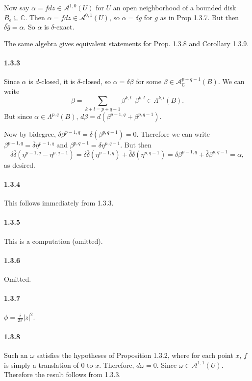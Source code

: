 \documentclass[10pt,letter]{article}
\begin{document}
Now say $\alpha = f dz \in \mathcal{A}^{1,0}(U)$ for $U$ an open neighborhood of a bounded disk $B_{\epsilon} \subseteq \mathbb{C}$. Then $\bar{\alpha} = \bar{f} d\bar{z} \in \mathcal{A}^{0,1}(U)$, so $\bar{\alpha} = \bar{\delta} g$ for $g$ as in Prop 1.3.7. But then $\overline{\delta \bar{g}} = \alpha$. So $\alpha$ is $\delta$-exact. 

The same algebra gives equivalent statements for Prop. 1.3.8 and Corollary 1.3.9. 

\paragraph*{1.3.3} Since $\alpha$ is $d$-closed, it is ${\delta}$-closed, so $\alpha = \delta \beta$ for some $\beta \in \mathcal{A}^{p+q-1}_{\mathbb{C}}(B)$. We can write
\[ \beta = \sum_{k + l = p+q-1} \beta^{k,l} \ \ \beta^{k,l} \in \Lambda^{k,l}(B).\] But since $\alpha \in \Lambda^{p,q}(B)$, $d \beta = d(\beta^{p-1,q} + \beta^{p,q-1})$.

Now by bidegree, $\bar{\delta} \beta^{p-1,q} = \delta(\beta^{p,q-1}) = 0$. Therefore we can write $\beta^{p-1,q} = \bar{\delta} \eta^{p-1,q}$ and $\beta^{p,q-1} = \delta \eta^{p,q-1}$. But then 
\[ \delta \bar{\delta} (\eta^{p-1,q} - \eta^{p,q-1}) = \delta \bar{\delta}(\eta^{p-1,q}) + \bar{\delta} \delta(\eta^{p,q-1}) = \delta \beta^{p-1,q} + \bar{\delta} \beta^{p,q-1} = \alpha,\]
as desired. 

\paragraph*{1.3.4} This follows immediately from 1.3.3. 

\paragraph*{1.3.5} This is a computation (omitted).

\paragraph*{1.3.6} Omitted.

\paragraph*{1.3.7} $\phi = \frac{i}{2\pi} \vert z \vert^2$. 

\paragraph*{1.3.8} Such an $\omega$ satisfies the hypotheses of Proposition 1.3.2, where for each point $x$, $f$ is simply a translation of $0$ to $x$. Therefore, $d\omega = 0$. Since $\omega \in \mathcal{A}^{1,1}(U)$. Therefore the result follows from 1.3.3. 
\end{document}
